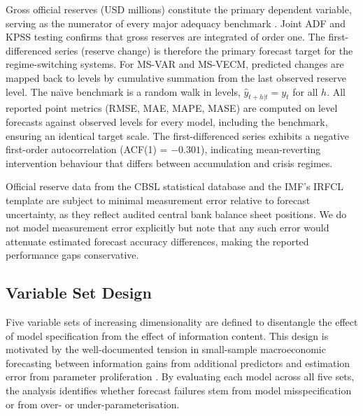 \documentclass[12pt,a4paper]{article}
\begin{document}
Gross official reserves (USD millions) constitute the primary dependent variable, serving as the numerator of every major adequacy benchmark \citep{JeanneRanciere2011,Obstfeld2010}. Joint ADF and KPSS testing confirms that gross reserves are integrated of order one. The first-differenced series (reserve change) is therefore the primary forecast target for the regime-switching systems. For MS-VAR and MS-VECM, predicted changes are mapped back to levels by cumulative summation from the last observed reserve level. The na\"{\i}ve benchmark is a random walk in levels, $\hat{y}_{t+h|t}=y_t$ for all $h$. All reported point metrics (RMSE, MAE, MAPE, MASE) are computed on level forecasts against observed levels for every model, including the benchmark, ensuring an identical target scale. The first-differenced series exhibits a negative first-order autocorrelation (ACF(1) = $-0.301$), indicating mean-reverting intervention behaviour that differs between accumulation and crisis regimes.

Official reserve data from the CBSL statistical database and the IMF's IRFCL template are subject to minimal measurement error relative to forecast uncertainty, as they reflect audited central bank balance sheet positions. We do not model measurement error explicitly but note that any such error would attenuate estimated forecast accuracy differences, making the reported performance gaps conservative.

\subsection{Variable Set Design}

Five variable sets of increasing dimensionality are defined to disentangle the effect of model specification from the effect of information content. This design is motivated by the well-documented tension in small-sample macroeconomic forecasting between information gains from additional predictors and estimation error from parameter proliferation \citep{Banbura2010,Carriero2015}. By evaluating each model across all five sets, the analysis identifies whether forecast failures stem from model misspecification or from over- or under-parameterisation.
\end{document}

